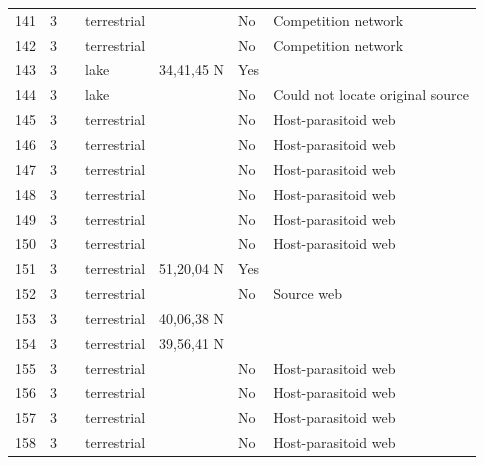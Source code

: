 \documentclass[12pt]{article}
\begin{document}
\begin{landscape}
\begin{table}[h!]
{\begin{tabular}{p{2.8cm}p{1.3cm}p{3cm}p{2.2cm}p{2.5cm}lp{8.2cm}}
        141   & 3 & \cite{Seifert1976}  & terrestrial &       & No    & Competition network \\
        142   & 3 & \cite{Seifert1976}  & terrestrial &       & No    & Competition network \\
        143   & 3 & \cite{Snow1958}    & lake  & 34,41,45 N & Yes   &       \\
        144   & 3 & \cite{Snow1958}  & lake  &       & No    & Could not locate original source \\
        145   & 3 & \cite{Rejmanek1979}  & terrestrial &       & No    & Host-parasitoid web \\
        146   & 3 & \cite{Rejmanek1979}  & terrestrial &       & No    & Host-parasitoid web \\
        147   & 3 & \cite{Rejmanek1979}  & terrestrial &       & No    & Host-parasitoid web \\
        148   & 3 & \cite{Rejmanek1979}  & terrestrial &       & No    & Host-parasitoid web \\
        149   & 3 & \cite{Force1974}    & terrestrial &       & No    & Host-parasitoid web \\
        150   & 3 & \cite{Hopkins1984}     & terrestrial &       & No    & Host-parasitoid web \\
        151   & 3 & \cite{Richards1926}     & terrestrial & 51,20,04 N & Yes   &       \\
        152   & 3 & \cite{Whittaker1984}    & terrestrial &       & No    & Source web \\
        153   & 3 & \cite{Mayse1978}    & terrestrial & 40,06,38 N &   &     \\
        154   & 3 & \cite{Mayse1978}    & terrestrial & 39,56,41 N &   &     \\
        155   & 3 & \cite{Askew1975}     & terrestrial &       & No    & Host-parasitoid web \\
        156   & 3 & \cite{Askew1961}     & terrestrial &       & No    & Host-parasitoid web \\
        157   & 3 & \cite{Askew1961}     & terrestrial &       & No    & Host-parasitoid web \\
        158   & 3 & \cite{Askew1961}     & terrestrial &       & No    & Host-parasitoid web \\
         \hline
      \end{tabular}}%
      \end{table}

        \newpage


\end{landscape}
\end{document}
